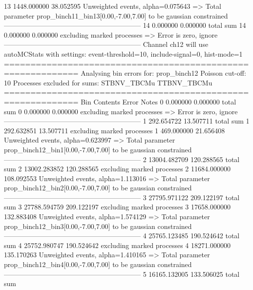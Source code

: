 13         1448.000000     38.052595       Unweighted events, alpha=0.075643
  => Total parameter prop_binch11_bin13[0.00,-7.00,7.00] to be gaussian constrained
------------------------------------------------------------
14         0.000000        0.000000        total sum                     
14         0.000000        0.000000        excluding marked processes    
  => Error is zero, ignore      
------------------------------------------------------------
Channel ch12 will use autoMCStats with settings: event-threshold=10, include-signal=0, hist-mode=1
============================================================
Analysing bin errors for: prop_binch12
Poisson cut-off: 10
Processes excluded for sums: STBNV_TBCMu TTBNV_TBCMu
============================================================
Bin        Contents        Error           Notes                         
0          0.000000        0.000000        total sum                     
0          0.000000        0.000000        excluding marked processes    
  => Error is zero, ignore      
------------------------------------------------------------
1          292.654722      13.507711       total sum                     
1          292.632851      13.507711       excluding marked processes    
1          469.000000      21.656408       Unweighted events, alpha=0.623997
  => Total parameter prop_binch12_bin1[0.00,-7.00,7.00] to be gaussian constrained
------------------------------------------------------------
2          13004.482709    120.288565      total sum                     
2          13002.283852    120.288565      excluding marked processes    
2          11684.000000    108.092553      Unweighted events, alpha=1.113016
  => Total parameter prop_binch12_bin2[0.00,-7.00,7.00] to be gaussian constrained
------------------------------------------------------------
3          27795.971122    209.122197      total sum                     
3          27788.594759    209.122197      excluding marked processes    
3          17658.000000    132.883408      Unweighted events, alpha=1.574129
  => Total parameter prop_binch12_bin3[0.00,-7.00,7.00] to be gaussian constrained
------------------------------------------------------------
4          25765.123485    190.524642      total sum                     
4          25752.980747    190.524642      excluding marked processes    
4          18271.000000    135.170263      Unweighted events, alpha=1.410165
  => Total parameter prop_binch12_bin4[0.00,-7.00,7.00] to be gaussian constrained
------------------------------------------------------------
5          16165.132005    133.506025      total sum                     
